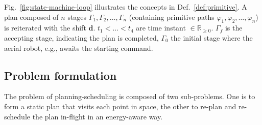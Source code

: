 \documentclass[letterpaper,10pt,journal,twoside]{IEEEtran}
\theoremstyle{definition}
\begin{document}

Fig.~\ref{fig:state-machine-loop} illustrates  the concepts in Def.~\ref{def:primitive}. A plan composed of $n$ stages $\Gamma_1,\Gamma_2,\dots,\Gamma_n$ (containing primitive paths $\varphi_1,\varphi_2,\dots,\varphi_n$) is reiterated with the shift $\mathbf{d}$. $t_1<\dots<t_4$ are time instant $\in\mathbb{R}_{\geq 0}$. $\Gamma_f$ is the accepting stage, indicating the plan is completed, $\Gamma_0$ the initial stage where the aerial robot, e.g., awaits the starting command.

\vspace*{-2ex}
\subsection{Problem formulation}
\label{sec:pbfor}

The problem of planning-scheduling is composed of two sub-problems. One is to form a static plan that visits each point in space, the other to re-plan and re-schedule the plan in-flight in an energy-aware way.
\end{document}
